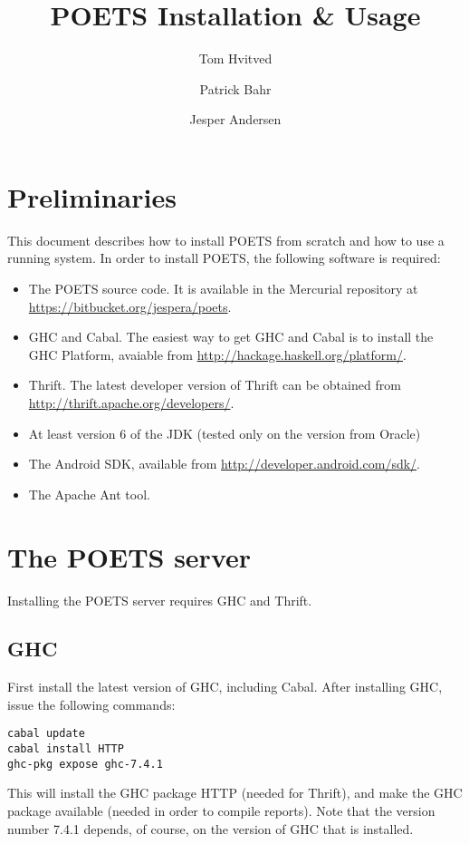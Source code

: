 \documentclass[10pt,final]{article}
\begin{document}
\title{POETS Installation \& Usage}
\author{Tom Hvitved \and Patrick Bahr \and Jesper Andersen}

\renewcommand{\today}{\small Department of Computer Science, University of
    Copenhagen\\ Universitetsparken 1, 2100 Copenhagen, Denmark\\
  \{\texttt{hvitved,bahr,jespera}\}\texttt{@diku.dk}\\[2em]August 2013}

\maketitle

\tableofcontents

\section{Preliminaries}
This document describes how to install POETS from scratch and how to
use a running system. In order to install POETS, the following
software is required:
\begin{itemize}
\item The POETS source code. It is available in the Mercurial
  repository at \url{https://bitbucket.org/jespera/poets}.
\item GHC and Cabal. The easiest way to get GHC and Cabal is to
  install the GHC Platform, avaiable from
  \url{http://hackage.haskell.org/platform/}.
\item Thrift. The latest developer version of Thrift can be obtained
  from \url{http://thrift.apache.org/developers/}.
\item At least version 6 of the JDK (tested only on the version from
  Oracle)
\item The Android SDK, available from \url{http://developer.android.com/sdk/}.
\item The Apache Ant tool.
\end{itemize}

\section{The POETS server}\label{sec:poets-server}
Installing the POETS server requires GHC and Thrift.

\subsection{GHC}
First install the latest version of GHC, including Cabal. After
installing GHC, issue the following commands:
\begin{verbatim}
cabal update
cabal install HTTP
ghc-pkg expose ghc-7.4.1
\end{verbatim}
This will install the GHC package HTTP (needed for Thrift), and make
the GHC package available (needed in order to compile reports). Note
that the version number 7.4.1 depends, of course, on the version of
GHC that is installed.
\end{document}
